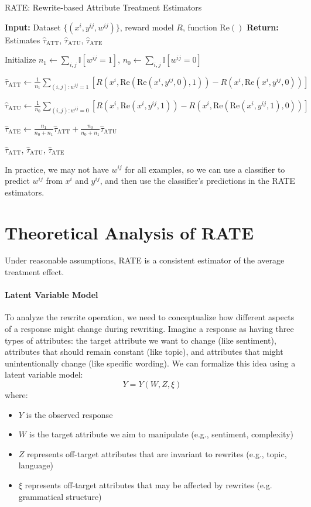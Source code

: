 \documentclass{article}
\begin{document}
\begin{algorithm}[H]
  \caption{RATE: Rewrite-based Attribute Treatment Estimators}
  \label{alg:rate}
  \begin{algorithmic}[1]
  \State \textbf{Input:} Dataset $\{(x^i, y^{ij}, w^{ij})\}$, reward model $R$, function $\text{Re}()$
  \State \textbf{Return:} Estimates $\hat{\tau}_{\text{ATT}}$, $\hat{\tau}_{\text{ATU}}$, $\hat{\tau}_{\text{ATE}}$
  
  \State Initialize $n_1 \leftarrow \sum_{i,j} \mathbb{I}[w^{ij} = 1]$, $n_0 \leftarrow \sum_{i,j} \mathbb{I}[w^{ij} = 0]$
  
  \State $\hat{\tau}_{\text{ATT}} \leftarrow \frac{1}{n_1} \sum\limits_{(i,j): w^{ij} = 1} [R(x^i, \text{Re}(\text{Re}(x^i, y^{ij}, 0), 1)) - R(x^i, \text{Re}(x^i, y^{ij}, 0))]$
  
  \State $\hat{\tau}_{\text{ATU}} \leftarrow \frac{1}{n_0} \sum\limits_{(i,j): w^{ij} = 0} [R(x^i, \text{Re}(x^i, y^{ij}, 1)) - R(x^i, \text{Re}(\text{Re}(x^i, y^{ij}, 1), 0))]$
  
  \State $\hat{\tau}_{\text{ATE}} \leftarrow \frac{n_1}{n_0 + n_1} \hat{\tau}_{\text{ATT}} + \frac{n_0}{n_0 + n_1} \hat{\tau}_{\text{ATU}}$
  
  \State \Return $\hat{\tau}_{\text{ATT}}$, $\hat{\tau}_{\text{ATU}}$, $\hat{\tau}_{\text{ATE}}$
  \end{algorithmic}
\end{algorithm}
In practice, we may not have $w^{ij}$ for all examples, so we can use a classifier to predict $w^{ij}$ from $x^i$ and $y^{ij}$, and then use the classifier's predictions in the RATE estimators.
  
\section{Theoretical Analysis of RATE}
\label{sec:theory}

Under reasonable assumptions, RATE is a consistent estimator of the average treatment effect.

\paragraph{Latent Variable Model}
To analyze the rewrite operation, we need to conceptualize how different aspects of a response might change during rewriting. Imagine a response as having three types of attributes: the target attribute we want to change (like sentiment), attributes that should remain constant (like topic), and attributes that might unintentionally change (like specific wording). We can formalize this idea using a latent variable model:
\[ Y = Y(W, Z, \xi) \]
where:
\begin{itemize}
  \item $Y$ is the observed response
  \item $W$ is the target attribute we aim to manipulate (e.g., sentiment, complexity)
  \item $Z$ represents off-target attributes that are invariant to rewrites (e.g., topic, language)
  \item $\xi$ represents off-target attributes that may be affected by rewrites (e.g. grammatical structure)
\end{itemize}
\end{document}
